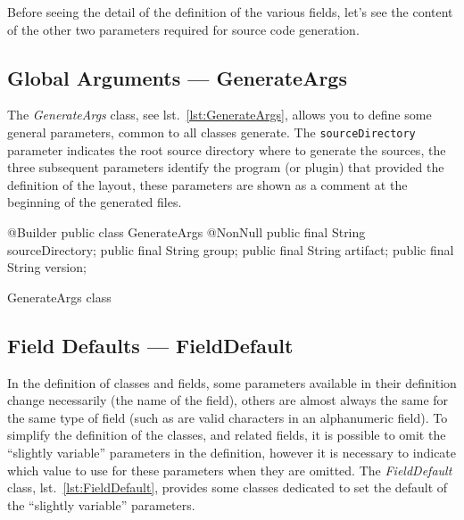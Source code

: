 \documentclass[a4paper,10pt]{report}
\newenvironment{elisting}[1][H]
  {\captionsetup{aboveskip=0pt}\begin{listing}[#1]}
  {\end{listing}%
}
\begin{document}
Before seeing the detail of the definition of the various fields, let's see the 
content of the other two parameters required for source code generation.

\subsection{Global Arguments --- GenerateArgs}
The \textsl{GenerateArgs} class, see lst.~\ref{lst:GenerateArgs}, allows you to 
define some general parameters, common to all classes generate. 
The \texttt{sourceDirectory} parameter indicates the root source directory where
to generate the sources, the three subsequent parameters identify the program 
(or plugin) that provided the definition of the layout, these parameters are 
shown as a comment at the beginning of the generated files.

\begin{elisting}[!htb]
\begin{javacode}
@Builder
public class GenerateArgs {
    @NonNull public final String sourceDirectory;
    public final String group;
    public final String artifact;
    public final String version;
}
\end{javacode}
\caption{GenerateArgs class}
\label{lst:GenerateArgs}
\end{elisting}

\subsection{Field Defaults --- FieldDefault}
In the definition of classes and fields, some parameters available in their 
definition change necessarily (the name of the field), others are almost always 
the same for the same type of field (such as are valid characters in an 
alphanumeric field).
To simplify the definition of the classes, and related fields, it is possible to
omit the ``slightly variable'' parameters in the definition, however it is 
necessary to indicate which value to use for these parameters when they are 
omitted. 
The \textsl{FieldDefault} class, lst.~\ref{lst:FieldDefault}, provides some 
classes dedicated to set the default of the ``slightly variable'' parameters.
\end{document}
